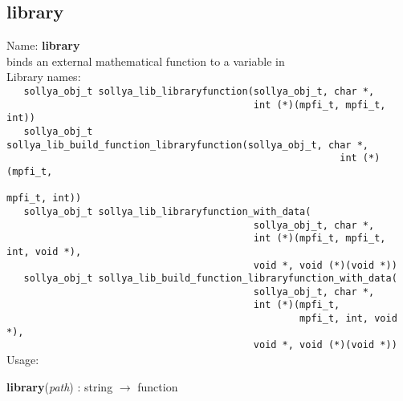 \subsection{library}
\label{lablibrary}
\noindent Name: \textbf{library}\\
\phantom{aaa}binds an external mathematical function to a variable in \sollya\\[0.2cm]
\noindent Library names:\\
\verb|   sollya_obj_t sollya_lib_libraryfunction(sollya_obj_t, char *,|\\
\verb|                                           int (*)(mpfi_t, mpfi_t, int))|\\
\verb|   sollya_obj_t sollya_lib_build_function_libraryfunction(sollya_obj_t, char *,|\\
\verb|                                                          int (*)(mpfi_t,|\\
\verb|                                                                  mpfi_t, int))|\\
\verb|   sollya_obj_t sollya_lib_libraryfunction_with_data(|\\
\verb|                                           sollya_obj_t, char *,|\\
\verb|                                           int (*)(mpfi_t, mpfi_t, int, void *),|\\
\verb|                                           void *, void (*)(void *))|\\
\verb|   sollya_obj_t sollya_lib_build_function_libraryfunction_with_data(|\\
\verb|                                           sollya_obj_t, char *,|\\
\verb|                                           int (*)(mpfi_t,|\\
\verb|                                                   mpfi_t, int, void *),|\\
\verb|                                           void *, void (*)(void *))|\\[0.2cm]
\noindent Usage: 
\begin{center}
\textbf{library}(\emph{path}) : \textsf{string} $\rightarrow$ \textsf{function}\\
\end{center}
